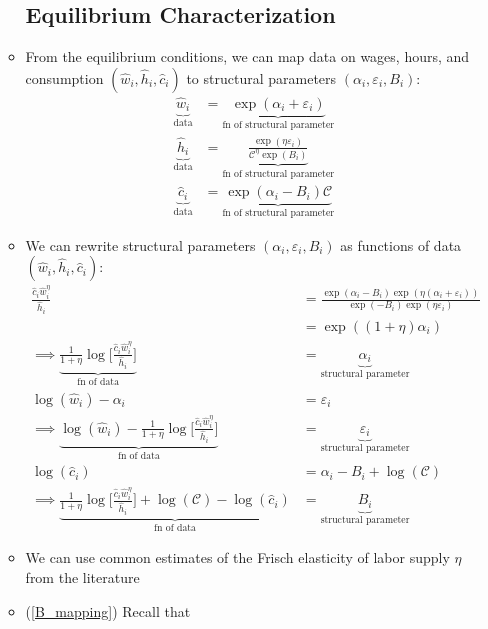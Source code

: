 \documentclass{article}
\begin{document}
\begin{enumerate}
\begin{itemize}
\subsection*{Equilibrium Characterization}
\item From the equilibrium conditions, we can map data on wages, hours, and consumption $(\hat w_i, \hat h_i, \hat c_i)$ to structural parameters $(\alpha_i, \varepsilon_i, B_i)$:
\begin{align*}
\underbrace{\hat w_i}_{\text{data}} &= \underbrace{\exp(\alpha_i + \varepsilon_i)}_{\text{fn of structural  parameter}}\\
\underbrace{\hat h_i}_{\text{data}} &= \underbrace{\frac{\exp(\eta \varepsilon_i)}{\mathcal{C}^\eta \exp(B_i)} }_{\text{fn of structural  parameter}}\\
\underbrace{\hat c_i}_{\text{data}} &= \underbrace{\exp(\alpha_i - B_i) \mathcal{C}}_{\text{fn of structural  parameter}}
\end{align*}
\item We can rewrite structural parameters $(\alpha_i, \varepsilon_i, B_i)$ as functions of data $(\hat w_i, \hat h_i, \hat c_i)$:
\begin{align}
\frac{\hat c_i\hat w_i^\eta}{\hat h_i} &= \frac{\exp(\alpha_i - B_i) \exp(\eta(\alpha_i + \varepsilon_i)
)}{\exp(-B_i)\exp(\eta \varepsilon_i)} \nonumber \\
&= \exp((1+\eta)\alpha_i) \nonumber \\
\implies
\underbrace{\frac{1}{1+\eta} \log\Bigg[\frac{\hat c_i \hat w_i^\eta}{\hat h_i}\Bigg]}_{\text{fn of data}} &= \underbrace{\alpha_i}_{\text{structural parameter}} \\
\log (\hat w_i) - \alpha_i &= \varepsilon_i \nonumber \\
\implies
\underbrace{\log (\hat w_i) - \frac{1}{1+\eta} \log\Bigg[\frac{\hat c_i \hat w_i^\eta}{\hat h_i}\Bigg]}_{\text{fn of data}} &= \underbrace{\varepsilon_i}_{\text{structural parameter}} \\
\log(\hat c_i) &= \alpha_i - B_i + \log(\mathcal{C}) \nonumber \\
\implies
\underbrace{\frac{1}{1+\eta} \log\Bigg[\frac{\hat c_i \hat w_i^\eta}{\hat h_i}\Bigg] + \log(\mathcal{C}) - \log(\hat c_i)}_{\text{fn of data}}  &=  \underbrace{B_i}_{\text{structural parameter}} \label{B_mapping}
\end{align}
\item We can use common estimates of the Frisch elasticity of labor supply $\eta$ from the literature
\item (\ref{B_mapping}) Recall that 

\end{itemize}
\end{enumerate}
\end{document}
